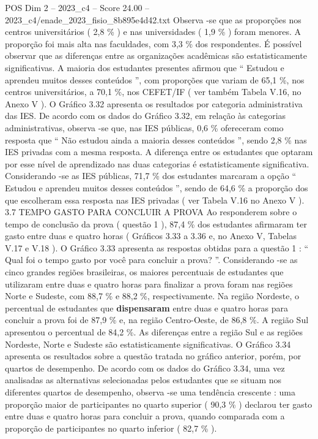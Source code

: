 \begin{textsample}{POS Dim 2 – 2023\_c4 – Score 24.00 – 2023\_c4/enade\_2023\_fisio\_8b895e4d42.txt}
Observa -se que as proporções nos centros universitários ( 2,8 \% ) e nas universidades ( 1,9 \% ) foram menores.
A proporção foi mais alta nas faculdades, com 3,3 \% dos respondentes.
É possível observar que as diferenças entre as organizações acadêmicas são estatisticamente significativas.
A maioria dos estudantes presentes afirmou que “ Estudou e aprendeu muitos desses conteúdos ”, com proporções que variam de 65,1 \%, nos centros universitários, a 70,1 \%, nos CEFET/IF ( ver também Tabela V.16, no Anexo V ).
O Gráfico 3.32 apresenta os resultados por categoria administrativa das IES.
De acordo com os dados do Gráfico 3.32, em relação às categorias administrativas, observa -se que, nas IES públicas, 0,6 \% ofereceram como resposta que “ Não estudou ainda a maioria desses conteúdos ”, sendo 2,8 \% nas IES privadas com a mesma resposta.
A diferença entre os estudantes que optaram por esse nível de aprendizado nas duas categorias é estatisticamente significativa.
Considerando -se as IES públicas, 71,7 \% dos estudantes marcaram a opção “ Estudou e aprendeu muitos desses conteúdos ”, sendo de 64,6 \% a proporção dos que escolheram essa resposta nas IES privadas ( ver Tabela V.16 no Anexo V ). 3.7 TEMPO GASTO PARA CONCLUIR A PROVA Ao responderem sobre o tempo de conclusão da prova ( questão 1 ), 87,4 \% dos estudantes afirmaram ter gasto entre duas e quatro horas ( Gráficos 3.33 a 3.36 e, no Anexo V, Tabelas V.17 e V.18 ).
O Gráfico 3.33 apresenta as respostas obtidas para a questão 1 : “ Qual foi o tempo gasto por você para concluir a prova? ”.
Considerando -se as cinco grandes regiões brasileiras, os maiores percentuais de estudantes que utilizaram entre duas e quatro horas para finalizar a prova foram nas regiões Norte e Sudeste, com 88,7 \% e 88,2 \%, respectivamente.
Na região Nordeste, o percentual de estudantes que \textbf{dispensaram} entre duas e quatro horas para concluir a prova foi de 87,9 \% e, na região Centro-Oeste, de 86,8 \%.
A região Sul apresentou o percentual de 84,2 \%.
As diferenças entre a região Sul e as regiões Nordeste, Norte e Sudeste são estatisticamente significativas.
O Gráfico 3.34 apresenta os resultados sobre a questão tratada no gráfico anterior, porém, por quartos de desempenho.
De acordo com os dados do Gráfico 3.34, uma vez analisadas as alternativas selecionadas pelos estudantes que se situam nos diferentes quartos de desempenho, observa -se uma tendência crescente : uma proporção maior de participantes no quarto superior ( 90,3 \% ) declarou ter gasto entre duas e quatro horas para concluir a prova, quando comparada com a proporção de participantes no quarto inferior ( 82,7 \% ).

\end{textsample}
